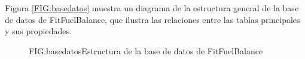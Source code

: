 Figura \ref{FIG:basedatos} muestra un diagrama de la estructura general de la base de datos de FitFuelBalance, que ilustra las relaciones entre las tablas principales y sus propiedades.

\begin{figure}[Estructura Base de Datos]{FIG:basedatos}{Estructura de la base de datos de FitFuelBalance}
\end{figure}